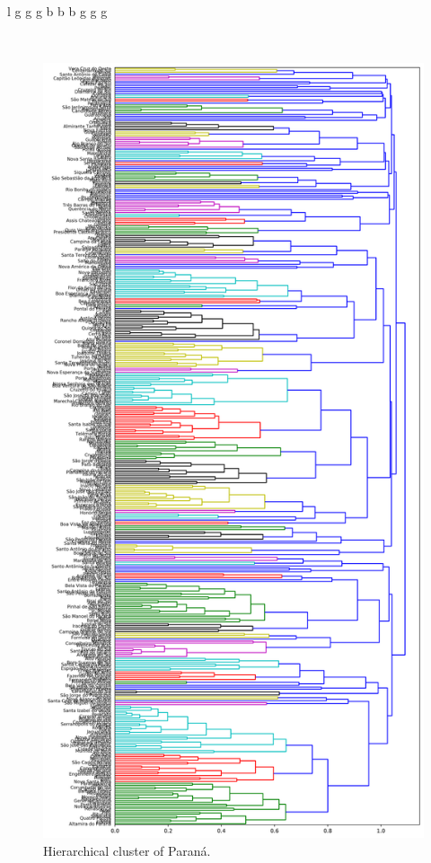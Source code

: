 \documentclass[12pt]{report}
\begin{document}
\scriptsize
\begin{center}
\begin{longtable}{l g g g b b b g g g}
\caption{Losses of Ceará}\\

\label{tab:clusters_size} 
\end{longtable} 
\end{center} 
\normalsize

\begin{figure}[h!]
 \centering
 \includegraphics[height=\textheight]{clusterPR_06.png}
 \caption{Hierarchical cluster of Paraná.}
 \label{fig:cluster_pr}
\end{figure}
\end{document}

